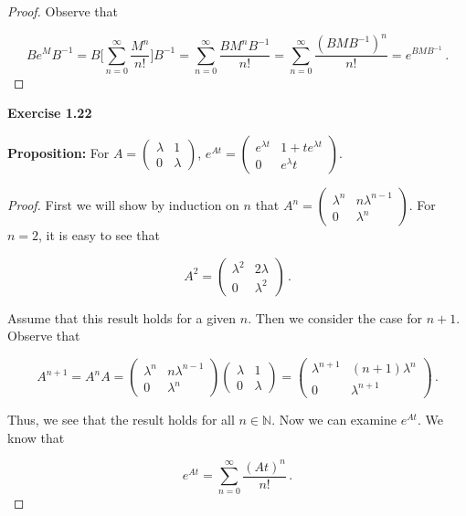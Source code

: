 \documentclass[a4paper]{article}
\numberwithin{equation}{section}
\begin{document}
\begin{description}
\begin{proof} Observe that

$$Be^MB^{-1} = B\Big[\sum_{n=0}^\infty \frac{M^n}{n!}\Big]B^{-1} = \sum_{n=0}^\infty \frac{BM^nB^{-1}}{n!} = \sum_{n=0}^\infty \frac{(BMB^{-1})^n}{n!} = e^{BMB^{-1}}\,.$$

\end{proof}

\item \textbf{Exercise 1.22}

\item \textbf{Proposition: }For $A = \begin{pmatrix}
\lambda & 1 \\
0 & \lambda
\end{pmatrix}$, $e^{At} = \begin{pmatrix}
e^{{\lambda}t} & 1+te^{{\lambda}t} \\
0 & {e^{\lambda}t}
\end{pmatrix}$.

\begin{proof} First we will show by induction on $n$ that $A^n = \begin{pmatrix}
\lambda^n & n\lambda^{n-1} \\
0 & \lambda^n
\end{pmatrix}$. For $n = 2$, it is easy to see that

$$A^2 = \begin{pmatrix}
\lambda^2 & 2\lambda^{} \\
0 & \lambda^2
\end{pmatrix}\,.$$

Assume that this result holds for a given $n$. Then we consider the case for $n+1$. Observe that

$$A^{n+1} = A^nA =  \begin{pmatrix}
\lambda^n & n\lambda^{n-1} \\
0 & \lambda^n
\end{pmatrix}\begin{pmatrix}
\lambda & 1 \\
0 & \lambda
\end{pmatrix} = \begin{pmatrix}
\lambda^{n+1} & (n+1)\lambda^{n} \\
0 & \lambda^{n+1}
\end{pmatrix}\,.$$

Thus, we see that the result holds for all $n \in \mathbb{N}$. Now we can examine $e^{At}$. We know that 

$$e^{At} = \sum_{n=0}^{\infty} \frac{(At)^n}{n!}\,.$$


\end{proof}
\end{description}
\end{document}
